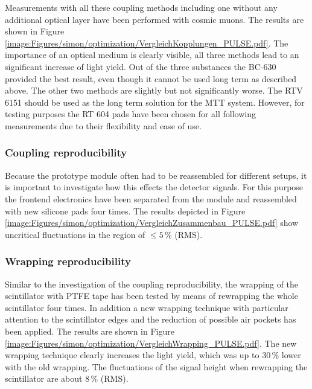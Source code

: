Measurements with all these coupling methods including one without any additional optical layer have been performed with cosmic muons. The results are shown in Figure \ref{image:Figures/simon/optimization/VergleichKopplungen_PULSE.pdf}. The importance of an optical medium is clearly visible, all three methods lead to an significant increase of light yield. Out of the three substances the BC-630 provided the best result, even though it cannot be used long term as described above. The other two methods are slightly but not significantly worse. The RTV 6151 should be used as the long term solution for the MTT system. However, for testing purposes the RT 604 pads have been chosen for all following measurements due to their flexibility and ease of use. 
%
%
\subsubsection{Coupling reproducibility}
\label{section:simon/optimization/recoupling}
Because the prototype module often had to be reassembled for different setups, it is important to investigate how this effects the detector signals. For this purpose the frontend electronics have been separated from the module and reassembled with new silicone pads four times. The results depicted in Figure \ref{image:Figures/simon/optimization/VergleichZusammenbau_PULSE.pdf} show uncritical fluctuations in the region of $\leq 5\,\%$ (RMS). 
%
\subsubsection{Wrapping reproducibility}
\label{section:simon/optimization/rewrapping}
Similar to the investigation of the coupling reproducibility, the wrapping of the scintillator with PTFE tape has been tested by means of rewrapping the whole scintillator four times. In addition a new wrapping technique with particular attention to the scintillator edges and the reduction of possible air pockets has been applied. The results are shown in Figure \ref{image:Figures/simon/optimization/VergleichWrapping_PULSE.pdf}. The new wrapping technique clearly increases the light yield, which was up to $30\,\%$ lower with the old wrapping. The fluctuations of the signal height when rewrapping the scintillator are about $8\,\%$ (RMS).

